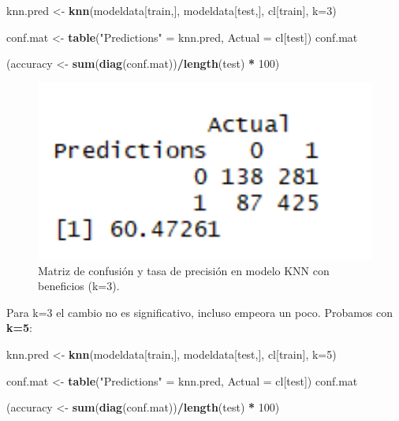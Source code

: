 \documentclass[spanish,]{article}
\newenvironment{Shaded}{\begin{snugshade}}{\end{snugshade}}
\newcommand{\KeywordTok}[1]{\textcolor[rgb]{0.13,0.29,0.53}{\textbf{#1}}}
\newcommand{\DataTypeTok}[1]{\textcolor[rgb]{0.13,0.29,0.53}{#1}}
\newcommand{\DecValTok}[1]{\textcolor[rgb]{0.00,0.00,0.81}{#1}}
\newcommand{\StringTok}[1]{\textcolor[rgb]{0.31,0.60,0.02}{#1}}
\newcommand{\OperatorTok}[1]{\textcolor[rgb]{0.81,0.36,0.00}{\textbf{#1}}}
\newcommand{\NormalTok}[1]{#1}
\begin{document}
\begin{Shaded}
\begin{Highlighting}[]
\NormalTok{knn.pred <-}\StringTok{ }\KeywordTok{knn}\NormalTok{(modeldata[train,], modeldata[test,], cl[train], }\DataTypeTok{k=}\DecValTok{3}\NormalTok{) }

\NormalTok{conf.mat <-}\StringTok{ }\KeywordTok{table}\NormalTok{(}\StringTok{"Predictions"}\NormalTok{ =}\StringTok{ }\NormalTok{knn.pred, }\DataTypeTok{Actual =}\NormalTok{ cl[test])}
\NormalTok{conf.mat}

\NormalTok{(accuracy <-}\StringTok{ }\KeywordTok{sum}\NormalTok{(}\KeywordTok{diag}\NormalTok{(conf.mat))}\OperatorTok{/}\KeywordTok{length}\NormalTok{(test) }\OperatorTok{*}\StringTok{ }\DecValTok{100}\NormalTok{)}
\end{Highlighting}
\end{Shaded}

\begin{figure}[h]
    \centering
    \includegraphics[width=1\textwidth]{figuras/KNN/benefits_k3.png}
    \caption{Matriz de confusión y tasa de precisión en modelo KNN con beneficios (k=3).}
    \label{fig:KNN:benefitsK3}
\end{figure}

Para k=3 el cambio no es significativo, incluso empeora un poco.
Probamos con \textbf{k=5}:

\begin{Shaded}
\begin{Highlighting}[]
\NormalTok{knn.pred <-}\StringTok{ }\KeywordTok{knn}\NormalTok{(modeldata[train,], modeldata[test,], cl[train], }\DataTypeTok{k=}\DecValTok{5}\NormalTok{) }

\NormalTok{conf.mat <-}\StringTok{ }\KeywordTok{table}\NormalTok{(}\StringTok{"Predictions"}\NormalTok{ =}\StringTok{ }\NormalTok{knn.pred, }\DataTypeTok{Actual =}\NormalTok{ cl[test])}
\NormalTok{conf.mat}

\NormalTok{(accuracy <-}\StringTok{ }\KeywordTok{sum}\NormalTok{(}\KeywordTok{diag}\NormalTok{(conf.mat))}\OperatorTok{/}\KeywordTok{length}\NormalTok{(test) }\OperatorTok{*}\StringTok{ }\DecValTok{100}\NormalTok{)}
\end{Highlighting}
\end{Shaded}
\end{document}
